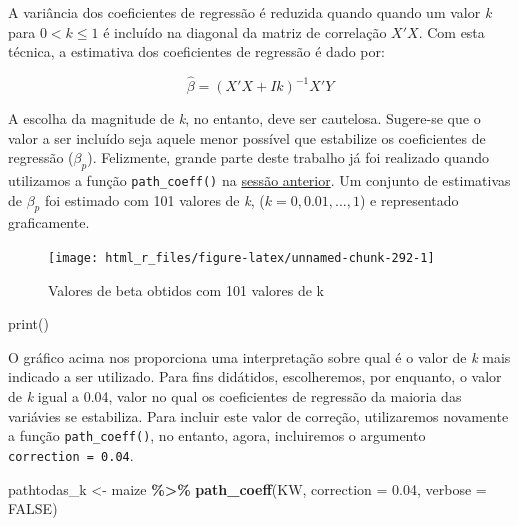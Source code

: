 \documentclass[
]{book}
\makeatletter
\newenvironment{Shaded}{\begin{snugshade}}{\end{snugshade}}
\newcommand{\DataTypeTok}[1]{\textcolor[rgb]{0.13,0.29,0.53}{#1}}
\newcommand{\FloatTok}[1]{\textcolor[rgb]{0.00,0.00,0.81}{#1}}
\newcommand{\KeywordTok}[1]{\textcolor[rgb]{0.13,0.29,0.53}{\textbf{#1}}}
\newcommand{\NormalTok}[1]{#1}
\newcommand{\OperatorTok}[1]{\textcolor[rgb]{0.81,0.36,0.00}{\textbf{#1}}}
\newcommand{\OtherTok}[1]{\textcolor[rgb]{0.56,0.35,0.01}{#1}}
\newcommand{\StringTok}[1]{\textcolor[rgb]{0.31,0.60,0.02}{#1}}
\numberwithin{equation}{section}
\newcommand{\indf}[1]{\index[function]{#1@\texttt{#1()}|ST}}
\makeatother
\begin{document}
A variância dos coeficientes de regressão é reduzida quando quando um valor \emph{k} para \(0 < k \leq 1\) é incluído na diagonal da matriz de correlação \(X'X\). Com esta técnica, a estimativa dos coeficientes de regressão é dado por:

\[
\hat \beta = (X'X+Ik)^{-1} X'Y
\]

A escolha da magnitude de \emph{k}, no entanto, deve ser cautelosa. Sugere-se que o valor a ser incluído seja aquele menor possível que estabilize os coeficientes de regressão (\(\beta_p\)). Felizmente, grande parte deste trabalho já foi realizado quando utilizamos a função \texttt{path\_coeff()} \indf{path\_coeff} na \protect\hyperlink{analise-tradicional}{sessão anterior}. Um conjunto de estimativas de \(\beta_p\) foi estimado com 101 valores de \emph{k}, (\(k = 0, 0.01, ..., 1\)) e representado graficamente.

\begin{Shaded}
\end{Shaded}

\begin{figure}

{\centering \texttt{[image: html\_r\_files/figure-latex/unnamed-chunk-292-1]} 

}

\caption{Valores de beta obtidos com 101 valores de k}\label{fig:unnamed-chunk-292}
\end{figure}

print()

O gráfico acima nos proporciona uma interpretação sobre qual é o valor de \emph{k} mais indicado a ser utilizado. Para fins didátidos, escolheremos, por enquanto, o valor de \emph{k} igual a 0.04, valor no qual os coeficientes de regressão da maioria das variávies se estabiliza. Para incluir este valor de correção, utilizaremos novamente a função \texttt{path\_coeff()}, no entanto, agora, incluiremos o argumento \texttt{correction\ =\ 0.04}.

\begin{Shaded}
\begin{Highlighting}[]
\NormalTok{pathtodas\_k \textless{}{-}}\StringTok{ }
\StringTok{  }\NormalTok{maize }\OperatorTok{\%\textgreater{}\%}\StringTok{ }
\StringTok{  }\KeywordTok{path\_coeff}\NormalTok{(KW, }\DataTypeTok{correction =} \FloatTok{0.04}\NormalTok{, }\DataTypeTok{verbose =} \OtherTok{FALSE}\NormalTok{)}
\end{Highlighting}
\end{Shaded}
\end{document}
